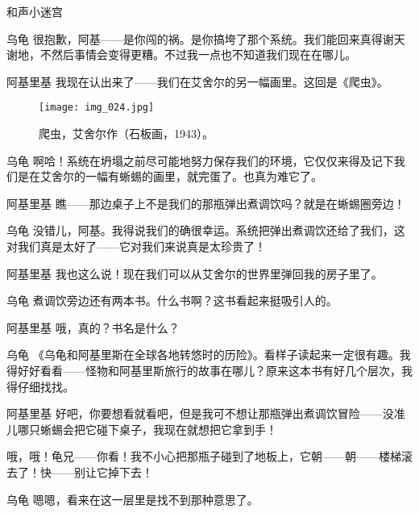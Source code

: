 \begin{dialog}{和声小迷宫}
\begin{dialogue}
\begin{dialogue}
\begin{dialogue}
    \item[乌龟]很抱歉，阿基——是你闯的祸。是你搞垮了那个系统。我们能回来真得谢天谢地，不然后事情会变得更糟。不过我一点也不知道我们现在在哪儿。

    \item[阿基里基]我现在认出来了——我们在艾舍尔的另一幅画里。这回是《爬虫》。

\begin{figure}
\texttt{[image: img\_024.jpg]}
\caption[爬虫，艾舍尔作。]
  {爬虫，艾舍尔作（石板画，1943）。}
\end{figure}

    \item[乌龟]啊哈！系统在坍塌之前尽可能地努力保存我们的环境，它仅仅来得及记下我们是在艾舍尔的一幅有蜥蜴的画里，就完蛋了。也真为难它了。

    \item[阿基里基]瞧——那边桌子上不是我们的那瓶弹出煮调饮吗？就是在蜥蜴圈旁边！

    \item[乌龟]没错儿，阿基。我得说我们的确很幸运。系统把弹出煮调饮还给了我们，这对我们真是太好了——它对我们来说真是太珍贵了！

    \item[阿基里基]我也这么说！现在我们可以从艾舍尔的世界里弹回我的房子里了。

    \item[乌龟]煮调饮旁边还有两本书。什么书啊？这书看起来挺吸引人的。

    \item[阿基里基]哦，真的？书名是什么？

    \item[乌龟]《乌龟和阿基里斯在全球各地转悠时的历险》。看样子读起来一定很有趣。我得好好看看——怪物和阿基里斯旅行的故事在哪儿？原来这本书有好几个层次，我得仔细找找。

    \item[阿基里基]好吧，你要想看就看吧，但是我可不想让那瓶弹出煮调饮冒险——没准儿哪只蜥蜴会把它碰下桌子，我现在就想把它拿到手！


    哦，哦！龟兄——你看！我不小心把那瓶子碰到了地板上，它朝——朝——楼梯滚去了！快——别让它掉下去！


    \item[乌龟]嗯嗯，看来在这一层里是找不到那种意思了。


\end{dialogue}
\end{dialogue}
\end{dialogue}
\end{dialog}
